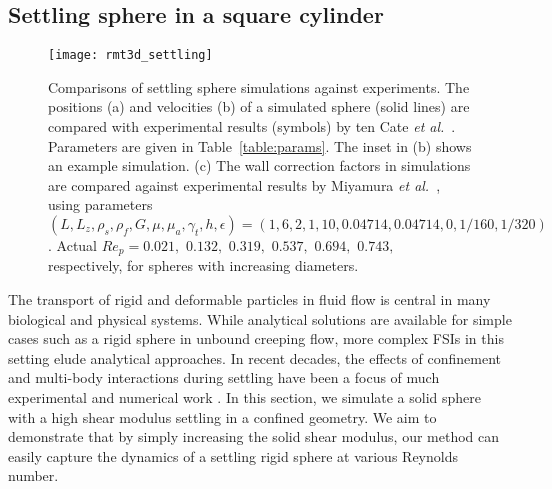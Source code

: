 \documentclass[times, 10pt]{article}
\newcommand{\Rey}{\textit{Re}}
\begin{document}
\begin{multicols}{2}
\subsection*{Settling sphere in a square cylinder}
            \begin{figure*}[ht]
            \centering
            \texttt{[image: rmt3d\_settling]}
            \caption{
		Comparisons of settling sphere simulations against experiments.
              The positions (a) and velocities (b) of a simulated sphere (solid lines) are compared with experimental results (symbols) by ten Cate \textit{et al.}~\cite{tenCate02}.
            Parameters are given in Table~\ref{table:params}.
            The inset in (b) shows an example simulation.
            (c) The wall correction factors in simulations are compared against experimental results by Miyamura \textit{et al.}~\cite{miyamura81}, using parameters $(L, L_z, \rho_s, \rho_f, G, \mu, \mu_a, \gamma_t, h, \epsilon)=(1, 6, 2, 1, 10, 0.04714, 0.04714, 0, 1/160, 1/320)$.
            Actual $\Rey_p=0.021,$ $0.132,$ $0.319,$ $0.537,$ $0.694,$ $0.743,$ respectively, for spheres with increasing diameters.}\label{fig:settling}
             \end{figure*}

The transport of rigid and deformable particles in fluid flow is central in many biological and physical systems.
While analytical solutions are available for simple cases such as a rigid sphere in unbound creeping flow, more complex FSIs in this setting elude analytical approaches.
In recent decades, the effects of confinement and multi-body interactions during settling have been a focus of much experimental and numerical work \cite{miyamura81, tenCate02, macmeccan09, van_der_sman10, ghosh15, alapati15}.
In this section, we simulate a solid sphere with a high shear modulus settling in a confined geometry.
We aim to demonstrate that by simply increasing the solid shear modulus, our method can easily capture the dynamics of a settling rigid sphere at various Reynolds number.


\end{multicols}
\end{document}

